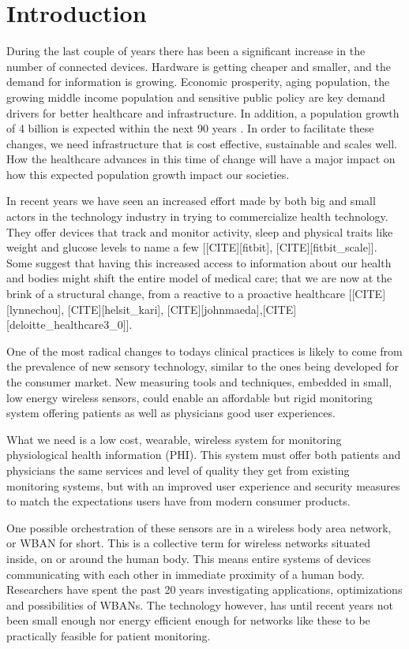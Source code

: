 \section{Introduction} %
\label{sec:introduction}

During the last couple of years there has been a significant increase in the number of connected devices. Hardware is getting cheaper and smaller, and the demand for information is growing. Economic prosperity, aging population, the growing middle income population and sensitive public policy are key demand drivers for better healthcare and infrastructure. In addition, a population growth of 4 billion is expected within the next 90 years \cite{WPP2015_Methodology}. In order to facilitate these changes, we need infrastructure that is cost effective, sustainable and scales well. How the healthcare advances in this time of change will have a major impact on how this expected population growth impact our societies. 

In recent years we have seen an increased effort made by both big and small actors in the technology industry in trying to commercialize health technology. They offer devices that track and monitor activity, sleep and physical traits like weight and glucose levels to name a few [[CITE][fitbit], [CITE][fitbit_scale]]. Some suggest that having this increased access to information about our health and bodies might shift the entire model of medical care; that we are now at the brink of a structural change, from a reactive to a proactive healthcare [[CITE][lynnechou], [CITE][helsit_kari], [CITE][johnmaeda],[CITE][deloitte_healthcare3_0]].

One of the most radical changes to todays clinical practices is likely to come from the prevalence of new sensory technology, similar to the ones being developed for the consumer market. New measuring tools and techniques, embedded in small, low energy wireless sensors, could enable an affordable but rigid monitoring system offering patients as well as physicians good user experiences. 

What we need is a low cost, wearable, wireless system for monitoring physiological health information (PHI). This system must offer both patients and physicians the same services and level of quality they get from existing monitoring systems, but with an improved user experience and security measures to match the expectations users have from modern  consumer products. 

One possible orchestration of these sensors are in a wireless body area network, or WBAN for short. This is a collective term for wireless networks situated inside, on or around the human body. This means entire systems of devices communicating with each other in immediate proximity of a human body. Researchers have spent the past 20 years investigating applications, optimizations and possibilities of WBANs. The technology however, has until recent years not been small enough nor energy efficient enough for networks like these to be practically feasible for patient monitoring.

